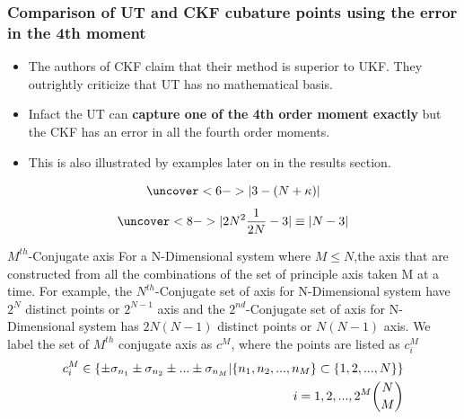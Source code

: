\documentclass{beamer}
\begin{document}
\begin{frame}
\frametitle{Comparison of UT and CKF cubature points using the error in the 4th moment}
\begin{itemize}[<+->]
\item The authors of CKF claim that their method is superior to UKF. They outrightly criticize that UT has no mathematical basis.
\item Infact the UT can {\bf capture one of the 4th order moment exactly} but the CKF has an error in all the fourth order moments.
\item This is also illustrated by examples later on in the results section. 
\end{itemize}
\begin{equation}
\uncover<6->{|3-(N+\kappa)|}
\end{equation}
\begin{equation}
\uncover<8->{|2N^2\frac{1}{2N}-3|\equiv |N-3|}
\end{equation}
\end{frame}
\begin{frame}
\begin{block}{$M^{th}$-Conjugate axis}
For a N-Dimensional system where $M\le N$,the axis that are constructed from all the combinations of the set of principle axis taken M at a time. For example, the $N^{th}$-Conjugate set of axis for N-Dimensional system have $2^N$ distinct points or $2^{N-1}$ axis and the $2^{nd}$-Conjugate set of axis for N-Dimensional system has $2N(N-1)$ distinct points or $N(N-1)$ axis. We label the set of $M^{th}$ conjugate axis as  $c^M$, where the points are listed as $c^M_i$
\begin{align*} 
c^M_i\in\{\pm\sigma_{n_1}\pm\sigma_{n_2} \pm ...\pm \sigma_{n_M}|\{n_1,n_2,...,n_M\}\subset\{1,2,...,N\}\}\\
i=1,2,...,2^M\dbinom{N}{M} 
\end{align*}
\end{block}
\end{frame}
\end{document}
